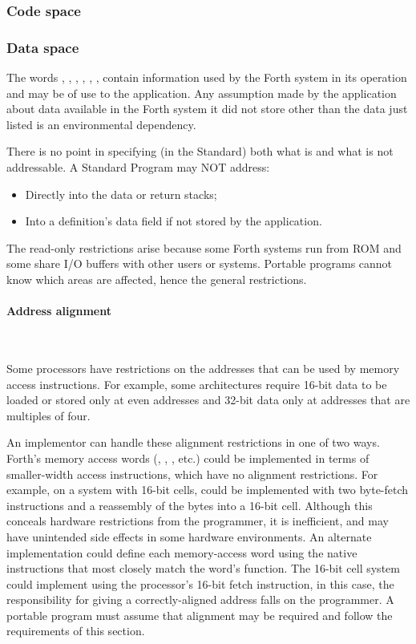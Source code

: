 \subsubsection{Code space} %

\subsubsection{Data space} %
\label{rat:dataspace}

The words , , , ,
, ,   contain information
used by the Forth system in its operation and may be of use to the
application. Any assumption made by the application about data
available in the Forth system it did not store other than the data
just listed is an environmental dependency.

There is no point in specifying (in the Standard) both what is and
what is not addressable. A Standard Program may NOT address:

\begin{itemize}
\item Directly into the data or return stacks;
\item Into a definition's data field if not stored by the application.
\end{itemize}

The read-only restrictions arise because some Forth systems run from
ROM and some share I/O buffers with other users or systems. Portable
programs cannot know which areas are affected, hence the general
restrictions.

\paragraph{Address alignment} ~ %
\label{rat:aaddr}

Some processors have restrictions on the addresses that can be used
by memory access instructions. For example, some architectures require
16-bit data to be loaded or stored only at even addresses and 32-bit
data only at addresses that are multiples of four.

An implementor can handle these alignment restrictions in one of two
ways. Forth's memory access words (, \word{!}, \word{+!},
etc.) could be implemented in terms of smaller-width access instructions,
which have no alignment restrictions.  For example, on a system with
16-bit cells,  could be implemented with two byte-fetch
instructions and a reassembly of the bytes into a 16-bit cell.  Although
this conceals hardware restrictions from the programmer, it is inefficient,
and may have unintended side effects in some hardware environments.
An alternate implementation could define each memory-access word
using the native instructions that most closely match the word's function.
The 16-bit cell system could implement  using the processor's
16-bit fetch instruction, in this case, the responsibility for giving
 a correctly-aligned address falls on the programmer.  A
portable program must assume that alignment may be required and
follow the requirements of this section.

